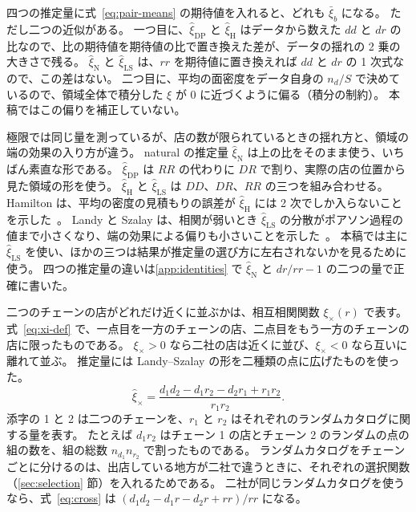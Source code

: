 \documentclass[a4paper,11pt]{ltjsarticle}
\begin{document}
四つの推定量に式~\eqref{eq:pair-means} の期待値を入れると、どれも $\bar\xi_b$ になる。
ただし二つの近似がある。
一つ目に、$\hat\xi_{\mathrm{DP}}$ と $\hat\xi_{\mathrm{H}}$ はデータから数えた $dd$ と $dr$ の比なので、比の期待値を期待値の比で置き換えた差が、データの揺れの 2 乗の大きさで残る。
$\hat\xi_{\mathrm{N}}$ と $\hat\xi_{\mathrm{LS}}$ は、$rr$ を期待値に置き換えれば $dd$ と $dr$ の 1 次式なので、この差はない。
二つ目に、平均の面密度をデータ自身の $n_d/S$ で決めているので、領域全体で積分した $\xi$ が $0$ に近づくように偏る（積分の制約）。
本稿ではこの偏りを補正していない。

極限では同じ量を測っているが、店の数が限られているときの揺れ方と、領域の端の効果の入り方が違う。
natural の推定量 $\hat\xi_{\mathrm{N}}$ は上の比をそのまま使う、いちばん素直な形である。
$\hat\xi_{\mathrm{DP}}$ は $RR$ の代わりに $DR$ で割り、実際の店の位置から見た領域の形を使う。
$\hat\xi_{\mathrm{H}}$ と $\hat\xi_{\mathrm{LS}}$ は $DD$、$DR$、$RR$ の三つを組み合わせる。
Hamilton は、平均の密度の見積もりの誤差が $\hat\xi_{\mathrm{H}}$ には 2 次でしか入らないことを示した~\cite{Hamilton1993}。
Landy と Szalay は、相関が弱いとき $\hat\xi_{\mathrm{LS}}$ の分散がポアソン過程の値まで小さくなり、端の効果による偏りも小さいことを示した~\cite{LandySzalay1993}。
本稿では主に $\hat\xi_{\mathrm{LS}}$ を使い、ほかの三つは結果が推定量の選び方に左右されないかを見るために使う。
四つの推定量の違いは\ref{app:identities} で $\hat\xi_{\mathrm{N}}$ と $dr/rr - 1$ の二つの量で正確に書いた。

二つのチェーンの店がどれだけ近くに並ぶかは、相互相関関数 $\xi_{\times}(r)$ で表す。
式~\eqref{eq:xi-def} で、一点目を一方のチェーンの店、二点目をもう一方のチェーンの店に限ったものである。
$\xi_{\times} > 0$ なら二社の店は近くに並び、$\xi_{\times} < 0$ なら互いに離れて並ぶ。
推定量には Landy--Szalay の形を二種類の点に広げたものを使った。
\begin{equation}
  \hat\xi_{\times} = \frac{d_1 d_2 - d_1 r_2 - d_2 r_1 + r_1 r_2}{r_1 r_2}.
  \label{eq:cross}
\end{equation}
添字の 1 と 2 は二つのチェーンを、$r_1$ と $r_2$ はそれぞれのランダムカタログに関する量を表す。
たとえば $d_1 r_2$ はチェーン 1 の店とチェーン 2 のランダムの点の組の数を、組の総数 $n_{d_1} n_{r_2}$ で割ったものである。
ランダムカタログをチェーンごとに分けるのは、出店している地方が二社で違うときに、それぞれの選択関数（\ref{sec:selection} 節）を入れるためである。
二社が同じランダムカタログを使うなら、式~\eqref{eq:cross} は $(d_1 d_2 - d_1 r - d_2 r + rr)/rr$ になる。
\end{document}
